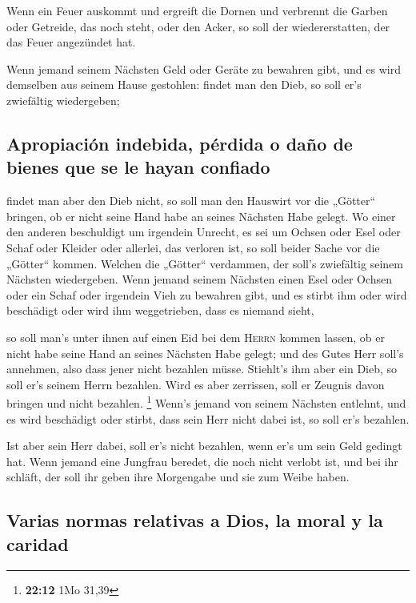 Wenn ein Feuer auskommt und ergreift die Dornen und
verbrennt die Garben oder Getreide, das noch steht, oder den Acker, so
soll der wiedererstatten, der das Feuer angezündet hat.

 Wenn jemand seinem Nächsten Geld oder Geräte zu bewahren
gibt, und es wird demselben aus seinem Hause gestohlen: findet man den
Dieb, so soll er's zwiefältig wiedergeben;

\hypertarget{apropiaciuxf3n-indebida-puxe9rdida-o-dauxf1o-de-bienes-que-se-le-hayan-confiado}{%
\subsection{Apropiación indebida, pérdida o daño de bienes que se le
hayan
confiado}\label{apropiaciuxf3n-indebida-puxe9rdida-o-dauxf1o-de-bienes-que-se-le-hayan-confiado}}

 findet man aber den Dieb nicht, so soll man den Hauswirt
vor die „Götter`` bringen, ob er nicht seine Hand habe an seines
Nächsten Habe gelegt.  Wo einer den anderen beschuldigt um
irgendein Unrecht, es sei um Ochsen oder Esel oder Schaf oder Kleider
oder allerlei, das verloren ist, so soll beider Sache vor die „Götter``
kommen. Welchen die „Götter`` verdammen, der soll's zwiefältig seinem
Nächsten wiedergeben.  Wenn jemand seinem Nächsten einen
Esel oder Ochsen oder ein Schaf oder irgendein Vieh zu bewahren gibt,
und es stirbt ihm oder wird beschädigt oder wird ihm weggetrieben, dass
es niemand sieht,

 so soll man's unter ihnen auf einen Eid bei dem
\textsc{Herrn} kommen lassen, ob er nicht habe seine Hand an seines
Nächsten Habe gelegt; und des Gutes Herr soll's annehmen, also dass
jener nicht bezahlen müsse.  Stiehlt's ihm aber ein Dieb,
so soll er's seinem Herrn bezahlen.  Wird es aber
zerrissen, soll er Zeugnis davon bringen und nicht bezahlen. \footnote{\textbf{22:12}
  1Mo 31,39}  Wenn's jemand von seinem Nächsten entlehnt,
und es wird beschädigt oder stirbt, dass sein Herr nicht dabei ist, so
soll er's bezahlen.

 Ist aber sein Herr dabei, soll er's nicht bezahlen, wenn
er's um sein Geld gedingt hat.  Wenn jemand eine Jungfrau
beredet, die noch nicht verlobt ist, und bei ihr schläft, der soll ihr
geben ihre Morgengabe und sie zum Weibe haben.

\hypertarget{varias-normas-relativas-a-dios-la-moral-y-la-caridad}{%
\subsection{Varias normas relativas a Dios, la moral y la
caridad}\label{varias-normas-relativas-a-dios-la-moral-y-la-caridad}}

